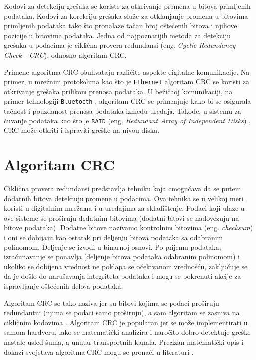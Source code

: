\documentclass[12pt,oneside]{memoir}
\begin{document}
Kodovi za detekciju grešaka se koriste za otkrivanje promena u bitova primljenih podataka. Kodovi za korekciju grešaka služe za otklanjanje promena u bitovima primljenih podataka tako što pronalaze tačan broj oštećenih bitova i njihove pozicije u bitovima podataka. Jedna od najpoznatijih metoda za detekciju grešaka u podacima je ciklična provera redundansi (eng. \textit{Cyclic Redundancy Check - CRC}), odnosno algoritam CRC.

Primene algoritma CRC obuhvataju različite aspekte digitalne komunikacije. Na primer, u mrežnim protokolima kao što je \texttt{Ethernet} \cite{ethernet_protocol} algoritam CRC se koristi za otkrivanje grešaka prilikom prenosa podataka. U bežičnoj komunikaciji, na primer tehnologiji \texttt{Bluetooth} \cite{bluetooth}, algoritam CRC se primenjuje kako bi se osigurala tačnost i pouzdanost prenosa podataka između uređaja. Takođe, u sistemu za čuvanje podataka kao što je \texttt{RAID} (eng. \textit{Redundant Array of Independent Disks}) \cite{raid}, CRC može 
otkriti i ispraviti greške na nivou diska.

\section{Algoritam CRC}

Ciklična provera redundansi predstavlja tehniku koja omogućava da se putem dodatnih bitova detektuju promene u podacima. Ova tehnika se u velikoj meri koristi u digitalnim mrežama i u uređajima za skladištenje. Podaci koji ulaze u ove sisteme se proširuju dodatnim bitovima (dodatni bitovi se nadovezuju na bitove podataka). Dodatne bitove nazivamo kontrolnim bitovima (eng. \textit{checksum}) i oni se dobijaju kao ostatak pri deljenju bitova podataka sa odabranim polinomom. Deljenje se izvodi u binarnoj osnovi. Po prijemu podataka, izračunavanje se ponavlja (deljenje bitova podataka odabranim polinomom) i ukoliko se dobijena vrednost ne poklapa se očekivanom vrednošću, zaključuje se da je došlo do narušavanja integriteta podataka i mogu se pokrenuti akcije za ispravljanje oštećenih delova podataka. %

Algoritam CRC se tako naziva jer su bitovi kojima se podaci proširuju redundantni (njima se podaci samo proširuju), a sam algoritam se zasniva na cikličnim kodovima \cite{cyclic_codes}. Algoritam CRC je popularan jer se može implementirati u samom hardveru, lako se matematički analizira i naročito dobro detektuje greške nastale usled šuma, a unutar transportnih kanala. Precizan matematički opis i dokazi svojstava algoritma CRC mogu se pronaći u literaturi \cite{crc_attributes}.
\end{document}
